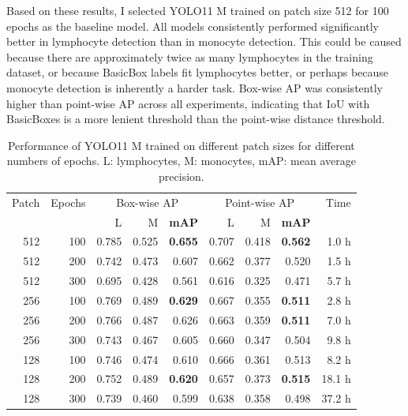 Based on these results, I selected YOLO11 M trained on patch size 512 for 100 epochs as the baseline model. All models consistently performed significantly better in lymphocyte detection than in monocyte detection. This could be caused because there are approximately twice as many lymphocytes in the training dataset, or because BasicBox labels fit lymphocytes better, or perhaps because monocyte detection is inherently a harder task. Box-wise AP was consistently higher than point-wise AP across all experiments, indicating that IoU with BasicBoxes is a more lenient threshold than the point-wise distance threshold.

\begin{table}
    \centering
    \begin{tabular}{rr|rrrrrrr}
        \toprule
        Patch & Epochs & \multicolumn{3}{c}{Box-wise AP} & \multicolumn{3}{c}{Point-wise AP} & Time \\
        & & L & M & \textbf{mAP} & L & M & \textbf{mAP} & \\
        \midrule
        512 & 100 & 0.785 & 0.525 & \textbf{0.655} & 0.707 & 0.418 & \textbf{0.562} & 1.0 h \\
        512 & 200 & 0.742 & 0.473 & 0.607 & 0.662 & 0.377 & 0.520 & 1.5 h \\
        512 & 300 & 0.695 & 0.428 & 0.561 & 0.616 & 0.325 & 0.471 & 5.7 h \\
        \midrule
        256 & 100 & 0.769 & 0.489 & \textbf{0.629} & 0.667 & 0.355 & \textbf{0.511} & 2.8 h \\
        256 & 200 & 0.766 & 0.487 & 0.626 & 0.663 & 0.359 & \textbf{0.511} & 7.0 h \\
        256 & 300 & 0.743 & 0.467 & 0.605 & 0.660 & 0.347 & 0.504 & 9.8 h \\
        \midrule
        128 & 100 & 0.746 & 0.474 & 0.610 & 0.666 & 0.361 & 0.513 & 8.2 h \\
        128 & 200 & 0.752 & 0.489 & \textbf{0.620} & 0.657 & 0.373 & \textbf{0.515} & 18.1 h \\
        128 & 300 & 0.739 & 0.460 & 0.599 & 0.638 & 0.358 & 0.498 & 37.2 h \\
        \bottomrule
    \end{tabular}
    \caption{Performance of YOLO11 M trained on different patch sizes for different numbers of epochs. L: lymphocytes, M: monocytes, mAP: mean average precision.}
    \label{tab:epochs}
\end{table}


